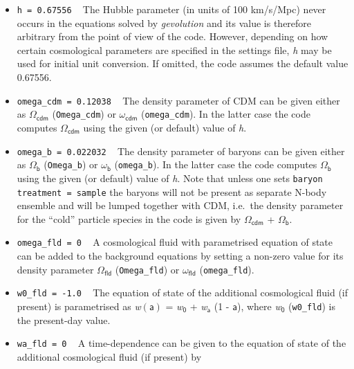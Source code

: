 \documentclass[a4paper,10pt]{article}
\begin{document}
\begin{itemize}
 \item[] \hspace{-25pt}\texttt{h = 0.67556} ~ The Hubble parameter (in units of 100 km/s/Mpc) never occurs in the equations solved by
 \textit{gevolution} and its value is therefore arbitrary from the point of view of the code. However, depending on how certain cosmological
 parameters are specified in the settings file, \textit{h} may be used for initial unit conversion. If omitted, the code assumes the default
 value 0.67556.
 \item[] \hspace{-25pt}\texttt{omega\_cdm = 0.12038} ~ The density parameter of CDM can be given either as $\mathsf{\Omega}_\mathsf{cdm}$
 (\texttt{Omega\_cdm}) or $\mathsf{\omega}_\mathsf{cdm}$ (\texttt{omega\_cdm}). In the latter case the code computes
 $\mathsf{\Omega}_\mathsf{cdm}$ using the given (or default) value of \textit{h}.
 \item[] \hspace{-25pt}\texttt{omega\_b = 0.022032} ~ The density parameter of baryons can be given either as $\mathsf{\Omega}_\mathsf{b}$
 (\texttt{Omega\_b}) or $\mathsf{\omega}_\mathsf{b}$ (\texttt{omega\_b}). In the latter case the code computes $\mathsf{\Omega}_\mathsf{b}$
 using the given (or default) value of \textit{h}. Note that unless one sets \texttt{baryon treatment = sample} the baryons will not be
 present as separate N-body ensemble and will be lumped together with CDM, i.e.\ the density parameter for the ``cold'' particle species in
 the code is given by $\mathsf{\Omega}_\mathsf{cdm}$ + $\mathsf{\Omega}_\mathsf{b}$.
 \item[] \hspace{-25pt}\texttt{omega\_fld = 0} ~ A cosmological fluid with parametrised equation of state can be added to the background equations
 by setting a non-zero value for its density parameter $\mathsf{\Omega}_\mathsf{fld}$ (\texttt{Omega\_fld}) or $\mathsf{\omega}_\mathsf{fld}$ (\texttt{omega\_fld}).
 \item[] \hspace{-25pt}\texttt{w0\_fld = -1.0} ~ The equation of state of the additional cosmological fluid (if present) is parametrised as
 \textit{w}$(\mathsf{a})$ = \textit{w}$_\mathsf{0}$ + \textit{w}$_\mathsf{a}$ (1 - $\mathsf{a}$), where \textit{w}$_\mathsf{0}$ (\texttt{w0\_fld}) is the present-day
 value.
 \item[] \hspace{-25pt}\texttt{wa\_fld = 0} ~ A time-dependence can be given to the equation of state of the additional cosmological fluid (if present) by

\end{itemize}
\end{document}
